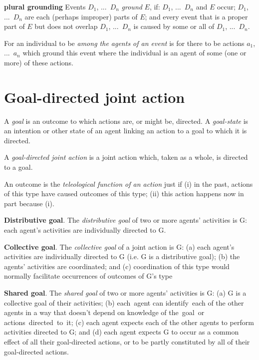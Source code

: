 \documentclass[11pt]{extarticle}
\begin{document}
\begin{multicols}{3}
\textbf{plural grounding} 
Events $D_1$, ...\ $D_n$ \emph{ground} $E$, if: $D_1$, ...\ $D_n$ and $E$ occur; 
$D_1$, ...\ $D_n$ are each (perhaps improper) parts of $E$; and 
every event that is a proper part of $E$ but does not overlap  $D_1$, ...\ $D_n$ is caused by some or all of $D_1$, ...\ $D_n$.

For an individual to be \emph{among the agents of an event} is for there to be actions $a_1$, ...\ $a_n$ which ground this event where the individual is an agent of some (one or more) of these actions.


\section{Goal-directed joint action}
A \emph{goal} is an outcome to which actions are, or might be, directed.  A \emph{goal-state} is an intention or other state of an agent linking an action to a goal to which it is directed.

A \emph{goal-directed joint action} is a joint action which, taken as a whole, is directed to a goal.

An outcome is the \emph{teleological function of an action} just if (i) in the past, actions of this type have caused outcomes of this type; (ii) this action happens now in part because (i).\citep{Wright:1976ls}



\textbf{Distributive goal}.  The \emph{distributive goal} of two or more agents' activities is G: each agent's activities are individually directed to G.

\textbf{Collective goal}.  The \emph{collective goal} of a joint action is G:
(a) each agent’s activities are individually directed to G (i.e. G is a distributive goal);
(b) the agents’ activities are coordinated; and 
(c) coordination of this type would normally  facilitate occurrences of outcomes of G's type

\textbf{Shared goal}.  The \emph{shared goal} of two or more agents' activities is G: (a) G is a collective goal of their activities; 
(b) each agent can identify each of the other agents in a way that doesn't depend on knowledge of the goal or	 actions directed to it;
(c) each agent expects each of the other agents to perform activities directed to G; and 
(d) each agent expects G to occur as a common effect of all their goal-directed actions, or to be partly constituted by all of their goal-directed actions.

\ %

\ %


\footnotesize 


\end{multicols}
\end{document}
